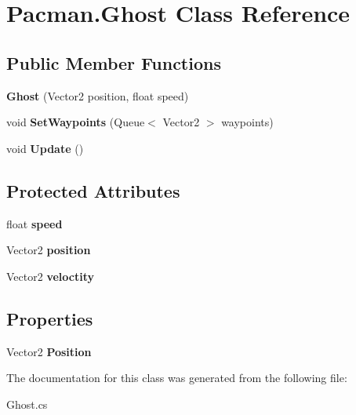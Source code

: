\hypertarget{class_pacman_1_1_ghost}{\section{Pacman.\-Ghost Class Reference}
\label{class_pacman_1_1_ghost}
}
\subsection*{Public Member Functions}
\begin{DoxyCompactItemize}
\item 
\hypertarget{class_pacman_1_1_ghost_a3177d340a3c9174cbeaada595135b81f}{{\bfseries Ghost} (Vector2 position, float speed)}\label{class_pacman_1_1_ghost_a3177d340a3c9174cbeaada595135b81f}

\item 
\hypertarget{class_pacman_1_1_ghost_adb07de4397c5686fa6d7025cdb0b9503}{void {\bfseries Set\-Waypoints} (Queue$<$ Vector2 $>$ waypoints)}\label{class_pacman_1_1_ghost_adb07de4397c5686fa6d7025cdb0b9503}

\item 
\hypertarget{class_pacman_1_1_ghost_aca4585cda07d2c78c54378d96501c2f0}{void {\bfseries Update} ()}\label{class_pacman_1_1_ghost_aca4585cda07d2c78c54378d96501c2f0}

\end{DoxyCompactItemize}
\subsection*{Protected Attributes}
\begin{DoxyCompactItemize}
\item 
\hypertarget{class_pacman_1_1_ghost_ac974f0fae982b856db0fd867a6f13b42}{float {\bfseries speed}}\label{class_pacman_1_1_ghost_ac974f0fae982b856db0fd867a6f13b42}

\item 
\hypertarget{class_pacman_1_1_ghost_a883ef3bd64b2394ed6af063c78beb4d1}{Vector2 {\bfseries position}}\label{class_pacman_1_1_ghost_a883ef3bd64b2394ed6af063c78beb4d1}

\item 
\hypertarget{class_pacman_1_1_ghost_a296bd2980df30f337d53613059c7c340}{Vector2 {\bfseries veloctity}}\label{class_pacman_1_1_ghost_a296bd2980df30f337d53613059c7c340}

\end{DoxyCompactItemize}
\subsection*{Properties}
\begin{DoxyCompactItemize}
\item 
\hypertarget{class_pacman_1_1_ghost_a4506a967db350b5d35abf2f78c71c3ad}{Vector2 {\bfseries Position}}\label{class_pacman_1_1_ghost_a4506a967db350b5d35abf2f78c71c3ad}

\end{DoxyCompactItemize}


The documentation for this class was generated from the following file\-:\begin{DoxyCompactItemize}
\item 
Ghost.\-cs\end{DoxyCompactItemize}
